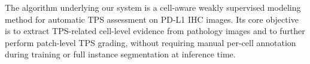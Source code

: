 \documentclass[journal]{vgtc}                     %
\begin{document}
The algorithm underlying our system is a cell-aware weakly supervised modeling method for automatic TPS assessment on PD-L1 IHC images. Its core objective is to extract TPS-related cell-level evidence from pathology images and to further perform patch-level TPS grading, without requiring manual per-cell annotation during training or full instance segmentation at inference time.
\end{document}
